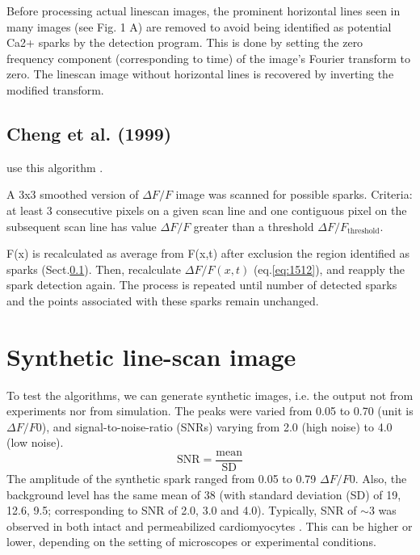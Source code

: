 \begin{framed}
  Before processing actual linescan images, the prominent horizontal
  lines seen in many images (see Fig. 1 A) are removed to avoid being
  identified as potential Ca2+ sparks by the detection program. This
  is done by setting the zero frequency component (corresponding to
  time) of the image's Fourier transform to zero. The linescan image
  without horizontal lines is recovered by inverting the modified
  transform.
\end{framed}



\subsection{Cheng et al. (1999)}
\label{sec:sparkdetect_cheng1999}

\citep{hollingworth2001} use this algorithm \citep{cheng1999}.

A 3x3 smoothed version of $\Delta F/F$ image was scanned for
possible sparks. Criteria: at least 3 consecutive pixels on a given scan line
and one contiguous pixel on the subsequent scan line has value $\Delta F/F$
greater than a threshold $\Delta F/F_\text{threshold}$.

F(x) is recalculated as average from F(x,t) after exclusion the region
identified as sparks (Sect.\ref{sec:sparkdetect_cheng1999}). Then,
recalculate $\Delta F/F(x,t)$ (eq.\ref{eq:1512}), and reapply the spark detection
again. The process is repeated until number of detected sparks and the points
associated with these sparks remain unchanged.


\section{Synthetic line-scan image}

To test the algorithms, we can generate synthetic images, i.e. the output not
from experiments nor from simulation. The peaks were varied from 0.05 to 0.70
(unit is $\Delta F/F0$), and signal-to-noise-ratio (SNRs) varying from 2.0
(high noise) to 4.0 (low noise).
\begin{equation}
\text{SNR} = \frac{\text{mean}}{\text{SD}}
\end{equation}
The amplitude of the synthetic spark ranged from 0.05 to 0.79 $\Delta F/F0$.
Also, the background level has the same mean of 38 (with standard deviation
(SD) of 19, 12.6, 9.5; corresponding to SNR of 2.0, 3.0 and 4.0). Typically, SNR
of $\sim 3$ was observed in both intact and permeabilized cardiomyocytes
\citep{picht2007}. This can be higher or lower, depending on the setting of
microscopes or experimental conditions. 



